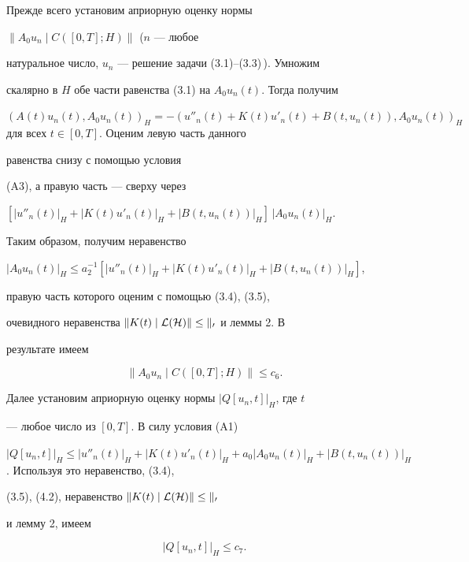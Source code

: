  


\begin{pf} 


Прежде всего установим априорную оценку нормы 


$\|A_0u_n\mid C([0,T];H)\|$ ($n$ --- любое 


натуральное число, $u_n$ --- решение задачи (3.1)--(3.3)\,). Умножим 


скалярно в $H$ обе части равенства (3.1) на $A_0u_n(t)$. Тогда получим 


$(A(t)u_n(t),A_0u_n(t))_H=-(u''_n(t)+K(t)u'_n(t)+B(t,u_n(t)), 


A_0u_n(t))_H$ для всех $t\in[0,T]$. Оценим левую часть данного 


равенства снизу с помощью условия 


(A3), а правую часть --- сверху через 


$[|u''_n(t)|_H+|K(t)u'_n(t)|_H+|B(t,u_n(t))|_H]\,|A_0u_n(t)|_H$. 


Таким образом, получим неравенство 


$|A_0u_n(t)|_H\le a^{-1}_2[|u''_n(t)|_H+|K(t)u'_n(t)|_H+ 


|B(t,u_n(t))|_H]$, 


правую часть которого оценим с помощью (3.4), (3.5), 


очевидного неравенства $\|K(t)\mid\cal L(H)\|\le k_0$ и леммы 2. В 


результате имеем 


\begin{equation} 


\|A_0u_n\mid C([0,T];H)\|\le c_6. 


\end{equation} 


Далее установим априорную оценку нормы $|Q[u_n,t]|_H$, где $t$ 


--- любое число из $[0,T]$. В силу условия (A1)\; 


$|Q[u_n,t]|_H\le|u''_n(t)|_H+|K(t)u'_n(t)|_H+a_0|A_0u_n(t)|_H+ 


|B(t,u_n(t))|_H$. Используя это неравенство, (3.4), 


(3.5), (4.2), неравенство $\|K(t)\mid\cal L(H)\|\le k_0$ 


и лемму 2, имеем 


\begin{equation} 


|Q[u_n,t]|_H\le c_7. 


\end{equation} 



\end{pf}
